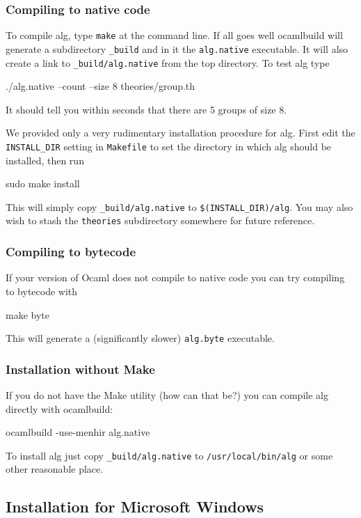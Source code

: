 \documentclass{article}
\begin{document}
\subsubsection{Compiling to native code}

To compile alg, type \texttt{make} at the command line. If all goes
well ocamlbuild will generate a subdirectory \texttt{\_build} and in
it the \texttt{alg.native} executable. It will also create a link to
\texttt{\_build/alg.native} from the top directory. To test alg type
%
\begin{shell}
./alg.native --count --size 8 theories/group.th
\end{shell}
%
It should tell you within seconds that there are 5 groups of size 8. 

We provided only a very rudimentary installation procedure for alg.
First edit the \texttt{INSTALL\_DIR} setting in \texttt{Makefile} to
set the directory in which alg should be installed, then run
%
\begin{shell}
sudo make install
\end{shell}
%
This will simply copy \texttt{\_build/alg.native} to
\texttt{\$(INSTALL\_DIR)/alg}. You may also wish to stash the
\texttt{theories} subdirectory somewhere for future reference.

\subsubsection{Compiling to bytecode}

If your version of Ocaml does not compile to native code you can try
compiling to bytecode with
%
\begin{shell}
make byte
\end{shell}
%
This will generate a (significantly slower) \texttt{alg.byte} executable.

\subsubsection{Installation without Make}

If you do not have the Make utility (how can that be?) you can compile
alg directly with ocamlbuild:
%
\begin{shell}
ocamlbuild -use-menhir alg.native
\end{shell}
%
To install alg just copy \texttt{\_build/alg.native} to
\texttt{/usr/local/bin/alg} or some other reasonable place.

\subsection{Installation for Microsoft Windows}
\label{sec:comp-inst-micr}
\end{document}
